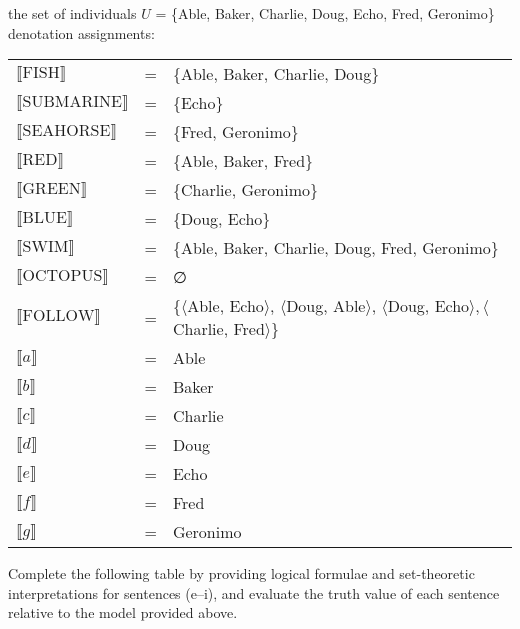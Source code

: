 {\ea the set of individuals $U$ = \{Able, Baker, Charlie, Doug, Echo, Fred, Geronimo\}
\ex denotation assignments:\smallskip\\
  \begin{tabularx}{\linewidth}{@{} l@{~}c@{~}Q  @{}}
$\llbracket\text{FISH}\rrbracket$      & = & \{Able, Baker, Charlie, Doug\}\\
$\llbracket\text{SUBMARINE}\rrbracket$ & = & \{Echo\}\\
$\llbracket\text{SEAHORSE}\rrbracket$  & = & \{Fred, Geronimo\}\\
$\llbracket\text{RED}\rrbracket$       & = & \{Able, Baker, Fred\}\\
$\llbracket\text{GREEN}\rrbracket$     & = & \{Charlie, Geronimo\}\\
$\llbracket\text{BLUE}\rrbracket$      & = & \{Doug, Echo\}\\
$\llbracket\text{SWIM}\rrbracket$      & = & \{Able, Baker, Charlie, Doug, Fred, Geronimo\}\\
$\llbracket\text{OCTOPUS}\rrbracket$   & = & ∅\\
$\llbracket\text{FOLLOW}\rrbracket$  & = & \{$\langle$Able, Echo$\rangle$, $\langle$Doug, Able$\rangle$, $\langle$Doug, Echo$\rangle,\langle$Charlie, Fred$\rangle$\}\\ 
$\llbracket a\rrbracket$ & = & Able    \\
$\llbracket b\rrbracket$ & = & Baker   \\
$\llbracket c\rrbracket$ & = & Charlie \\
$\llbracket d\rrbracket$ & = & Doug\\
$\llbracket e\rrbracket$ & = & Echo\\
$\llbracket f\rrbracket$ & = & Fred\\ 
$\llbracket g\rrbracket$ & = & Geronimo\\
\end{tabularx}
    \z 
    
\ex  
          Complete the following table by providing logical formulae and set-theoretic interpretations for sentences (e–i), and evaluate the truth value of each sentence relative to the model provided above.
    \z 

}

